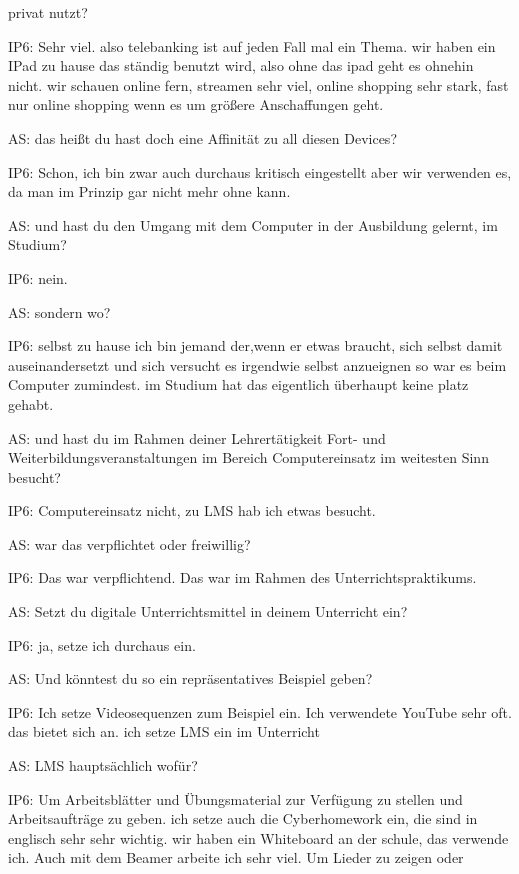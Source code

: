 \documentclass[fontsize=11pt,paper=a4]{scrbook}
\begin{document}
{\begin{itemize*}
privat nutzt?
\item[IP6:] Sehr viel.
also telebanking ist auf jeden Fall mal ein Thema.  wir haben ein IPad 
zu hause das ständig benutzt wird, also ohne
das ipad geht es ohnehin nicht.
wir schauen online fern, streamen sehr viel, online shopping
sehr stark, fast nur online shopping wenn es um größere
Anschaffungen geht.
\item[AS:]  das heißt du hast doch eine Affinität zu all diesen
Devices?
\item[IP6:] Schon, ich bin zwar auch durchaus kritisch eingestellt aber wir verwenden es, da man im Prinzip gar nicht mehr ohne kann. 
\item[AS:] und hast du
den Umgang mit dem Computer in der
Ausbildung gelernt, im Studium?
\item[IP6:] nein.
\item[AS:] sondern wo?
\item[IP6:] selbst zu hause
ich bin jemand der,wenn er
etwas braucht, sich selbst damit
auseinandersetzt und sich versucht es
irgendwie selbst anzueignen so war es beim
Computer zumindest. im Studium hat das
eigentlich überhaupt keine platz gehabt.
\item[AS:] und hast du im Rahmen deiner Lehrertätigkeit Fort- und
Weiterbildungsveranstaltungen im Bereich
Computereinsatz im weitesten Sinn besucht?
\item[IP6:] Computereinsatz nicht, zu LMS hab ich etwas besucht.
\item[AS:] war das
verpflichtet oder freiwillig?
\item[IP6:] Das war verpflichtend. Das war im Rahmen des Unterrichtspraktikums.
\item[AS:] Setzt du digitale Unterrichtsmittel in deinem
Unterricht ein?
\item[IP6:]  ja, setze ich durchaus ein.
\item[AS:] Und könntest du so ein repräsentatives Beispiel geben?
\item[IP6:] Ich setze Videosequenzen zum Beispiel ein. Ich 
verwendete YouTube sehr oft. das bietet sich an. ich setze LMS
ein im Unterricht
\item[AS:] LMS hauptsächlich wofür?
\item[IP6:] Um Arbeitsblätter und 
Übungsmaterial zur Verfügung zu stellen und
Arbeitsaufträge zu geben.
ich setze auch die Cyberhomework ein, die sind in englisch sehr sehr wichtig. wir
haben ein Whiteboard an der schule, das verwende ich. Auch mit dem Beamer arbeite ich sehr viel. Um Lieder zu zeigen oder

\end{itemize*}}
\end{document}
